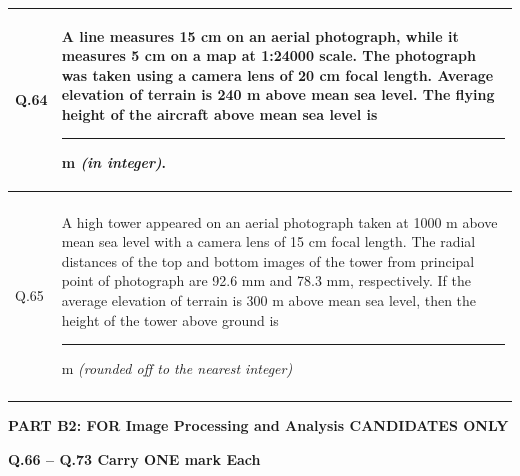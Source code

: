 \documentclass[12pt]{article}
\begin{document}
\begin{table}[H]
\renewcommand{\arraystretch}{3}
\setlength{\tabcolsep}{8pt}
\begin{tabular}{|l|p{15cm}|}
\hline
 
Q.64& A line measures 15 cm on an aerial photograph, while it measures 5 cm on a map
at 1:24000 scale. The photograph was taken using a camera lens of 20 cm focal
length. Average elevation of terrain is 240 m above mean sea level. The flying
height of the aircraft above mean sea level is\rule{2cm}{0.15mm} m \textit{(in integer)}.\\ \hline 
 & \\ \hline
Q.65&A high tower appeared on an aerial photograph taken at 1000 m above mean sea
level with a camera lens of 15 cm focal length. The radial distances of the top and
bottom images of the tower from principal point of photograph are 92.6 mm and
78.3 mm, respectively. If the average elevation of terrain is 300 m above mean sea
level, then the height of the tower above ground is \rule{2cm}{0.15mm} m \textit{(rounded off to the nearest integer)} \\ \hline
& \\ \hline

\end{tabular}
\end{table}


\newpage

\textbf{PART B2: FOR Image Processing and Analysis CANDIDATES ONLY} 

\textbf{Q.66 – Q.73 Carry ONE mark Each}
\end{document}
